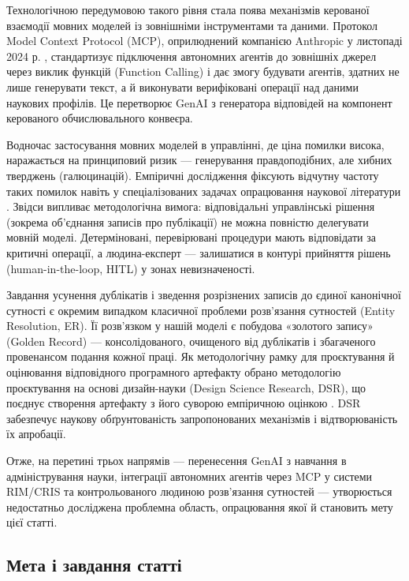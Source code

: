 Технологічною передумовою такого рівня стала поява механізмів керованої взаємодії мовних моделей із зовнішніми інструментами та даними. Протокол Model Context Protocol (MCP), оприлюднений компанією Anthropic у листопаді 2024 р. \cite{Anthropic2024MCP}, стандартизує підключення автономних агентів до зовнішніх джерел через виклик функцій (Function Calling) і дає змогу будувати агентів, здатних не лише генерувати текст, а й виконувати верифіковані операції над даними наукових профілів. Це перетворює GenAI з генератора відповідей на компонент керованого обчислювального конвеєра.

Водночас застосування мовних моделей в управлінні, де ціна помилки висока, наражається на принциповий ризик --- генерування правдоподібних, але хибних тверджень (галюцинацій). Емпіричні дослідження фіксують відчутну частоту таких помилок навіть у спеціалізованих задачах опрацювання наукової літератури \cite{Chelli2024HallucinationRates}. Звідси випливає методологічна вимога: відповідальні управлінські рішення (зокрема об'єднання записів про публікації) не можна повністю делегувати мовній моделі. Детерміновані, перевірювані процедури мають відповідати за критичні операції, а людина-експерт --- залишатися в контурі прийняття рішень (human-in-the-loop, HITL) у зонах невизначеності.

Завдання усунення дублікатів і зведення розрізнених записів до єдиної канонічної сутності є окремим випадком класичної проблеми розв'язання сутностей (Entity Resolution, ER). Її розв'язком у нашій моделі є побудова «золотого запису» (Golden Record) --- консолідованого, очищеного від дублікатів і збагаченого провенансом подання кожної праці. Як методологічну рамку для проєктування й оцінювання відповідного програмного артефакту обрано методологію проєктування на основі дизайн-науки (Design Science Research, DSR), що поєднує створення артефакту з його суворою емпіричною оцінкою \cite{Hevner2004DSR,Peffers2007DSRMeth,Gregor2013PositioningDSR}. DSR забезпечує наукову обґрунтованість запропонованих механізмів і відтворюваність їх апробації.

Отже, на перетині трьох напрямів --- перенесення GenAI з навчання в адміністрування науки, інтеграції автономних агентів через MCP у системи RIM/CRIS та контрольованого людиною розв'язання сутностей --- утворюється недостатньо досліджена проблемна область, опрацювання якої й становить мету цієї статті.

\subsection*{Мета і завдання статті}

